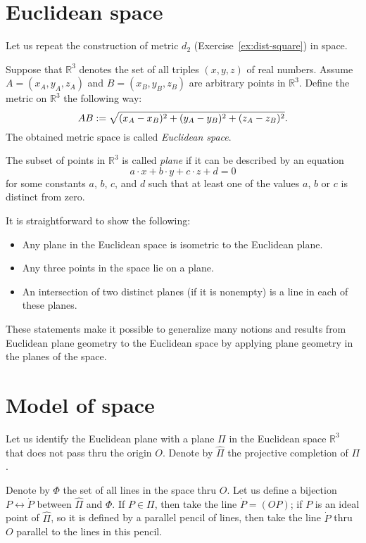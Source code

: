 \section{Euclidean space}

Let us repeat the construction of metric $d_2$ (Exercise~\ref{ex:dist-square}) in space.

Suppose that $\mathbb{R}^3$ denotes the set of all triples $(x,y,z)$ of real numbers.
Assume $A=(x_A,y_A,z_A)$ and $B=(x_B,y_B,z_B)$ are arbitrary points in $\mathbb{R}^3$.
Define the metric on $\mathbb{R}^3$ the following way:
$$AB
:=
\sqrt{(x_A-x_B)^2+(y_A-y_B)^2+(z_A-z_B)^2}.$$
The obtained metric space is called \emph{Euclidean space}.

The subset of points in $\mathbb{R}^3$ is called \emph{plane} if it can be
described by an equation
$$a\cdot x+b\cdot y+c\cdot z+d=0$$ 
for some constants $a$, $b$, $c$, and $d$ such that at least one of the values $a$, $b$ or $c$ is distinct from zero.

It is straightforward to show the following:
\begin{itemize}
 \item Any plane in the Euclidean space is isometric to the Euclidean plane.
 \item Any three points in the space lie on a plane.
 \item An intersection of two distinct planes (if it is nonempty) is a line in each of these planes.
\end{itemize}

These statements make it possible to generalize many notions and results from Euclidean plane geometry to the Euclidean space
by applying plane geometry in the planes of the space.

\section{Model of space}

Let us identify the Euclidean plane with a plane $\Pi$ in the Euclidean space $\mathbb{R}^3$ that does not pass thru the origin $O$.
Denote by $\hat\Pi$ the projective completion of $\Pi$.

Denote by $\Phi$ the set of all lines in the space thru $O$.
Let us define a bijection $P\leftrightarrow \dot P$ between $\hat \Pi$ and $\Phi$.
If $P\in \Pi$, then take the line $\dot P=(OP)$;
if $P$ is an ideal point of $\hat \Pi$, so it is defined by a parallel pencil of lines, then take the line $\dot P$ thru $O$ parallel to the lines in this pencil.

